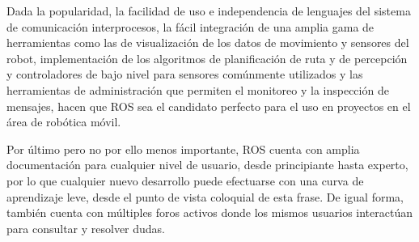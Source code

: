 Dada la popularidad, la facilidad de uso e independencia de lenguajes del sistema de comunicación interprocesos, la fácil integración de una amplia gama de herramientas como las de visualización de los datos de movimiento y sensores del robot, implementación de los algoritmos de planificación de ruta y de percepción y controladores de bajo nivel para sensores comúnmente utilizados y las herramientas de administración que permiten el monitoreo y la inspección de mensajes, hacen que ROS sea el candidato perfecto para el uso en proyectos en el área de robótica móvil.

Por último pero no por ello menos importante, ROS cuenta con amplia documentación \cite{answersros} para cualquier nivel de usuario, desde principiante hasta experto, por lo que cualquier nuevo desarrollo puede efectuarse con una curva de aprendizaje leve, desde el punto de vista coloquial de esta frase. De igual forma, también cuenta con múltiples foros activos donde los mismos usuarios interactúan para consultar y resolver dudas.